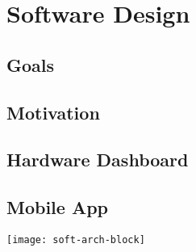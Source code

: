 \section{Software Design} \label{sec:soft-design}

\onehalfspacing

\subsection{Goals}

\subsection{Motivation}

\subsection{Hardware Dashboard}

\subsection{Mobile App}

\texttt{[image: soft-arch-block]}